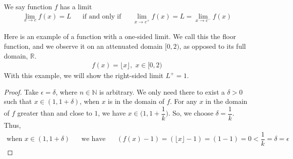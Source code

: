 \begin{theorem}
We say function $f$ has a limit
\begin{align*}
    \lim_{x \longrightarrow c} f(x) = L \hspace{20pt} \text{if and only if} \hspace{20pt} \lim_{x \longrightarrow c^{+}} f(x) = L = \lim_{x \longrightarrow c^{-}} f(x)
\end{align*}
\end{theorem}

\begin{example}
Here is an example of a function with a one-sided limit. We call this the floor function, and we observe it on an attenuated domain $[0, 2)$, as opposed to its full domain, $\mathbb{R}$. 
\begin{align*}
    f(x) = \lfloor x \rfloor, \hspace{4pt} x \in [0, 2)
\end{align*}
With this example, we will show the right-sided limit $L^{+} = 1$.
\begin{proof}
Take $\epsilon = \delta$, where $n \in \mathbb{N}$ is arbitrary. We only need there to exist a $\delta > 0$ such that $x \in (1, 1+\delta)$, when $x$ is in the domain of $f$. For any $x$ in the domain of $f$ greater than and close to $1$, we have $x \in \Big(1, 1+\dfrac{1}{k}\Big)$. So, we choose $\delta = \dfrac{1}{k}$. Thus,
\begin{align*}
    \text{when} \hspace{4pt} x \in (1, 1 + \delta) \hspace{20pt} \text{we have} \hspace{20pt} (f(x) - 1) = (\lfloor x \rfloor - 1) = (1 - 1) = 0 < \dfrac{1}{k} = \delta = \epsilon
\end{align*}
\end{proof}


\end{example}
